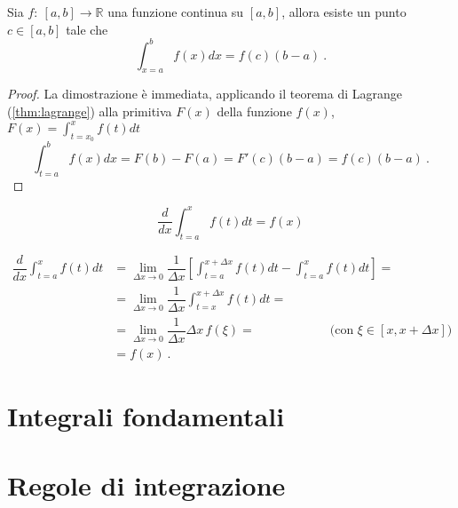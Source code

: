 \begin{theorem}
    Sia $f: \ [a,b] \rightarrow \mathbb{R}$ una funzione continua su $[a,b]$, allora esiste un punto $c \in [a,b]$ tale che
    \begin{equation}
        \int_{x=a}^{b} f(x) dx = f(c) (b-a) \ .
    \end{equation}
\end{theorem}
\begin{proof}
    La dimostrazione è immediata, applicando il teorema di Lagrange (\ref{thm:lagrange}) alla primitiva $F(x)$ della funzione $f(x)$, $F(x) = \int_{t=x_0}^{x} f(t) dt$ 
\begin{equation}
    \int_{t=a}^{b} f(x) dx = F(b) - F(a) = F'(c) (b-a) = f(c) (b-a) \ .
\end{equation}
\end{proof}


\begin{theorem}
    \begin{equation}
        \dfrac{d}{dx} \int_{t=a}^{x} f(t) dt = f(x)
    \end{equation}
\end{theorem}
\begin{equation}
    \begin{aligned}
        \dfrac{d}{dx} \int_{t=a}^{x} f(t) dt & = 
        \lim_{\Delta x \rightarrow 0} \dfrac{1}{\Delta x} \left[ \int_{t=a}^{x+\Delta x} f(t) dt - \int_{t=a}^{x} f(t) dt\right] = \\
        & = \lim_{\Delta x \rightarrow 0} \dfrac{1}{\Delta x} \int_{t=x}^{x+\Delta x} f(t) dt = \\
        & = \lim_{\Delta x \rightarrow 0} \dfrac{1}{\Delta x} \Delta x \, f(\xi) = \qquad \qquad \qquad \text{(con $\xi \in [x, x+\Delta x]$)} \\
        & = f(x)  \  .
    \end{aligned}
\end{equation}

\section{Integrali fondamentali}

\section{Regole di integrazione}
